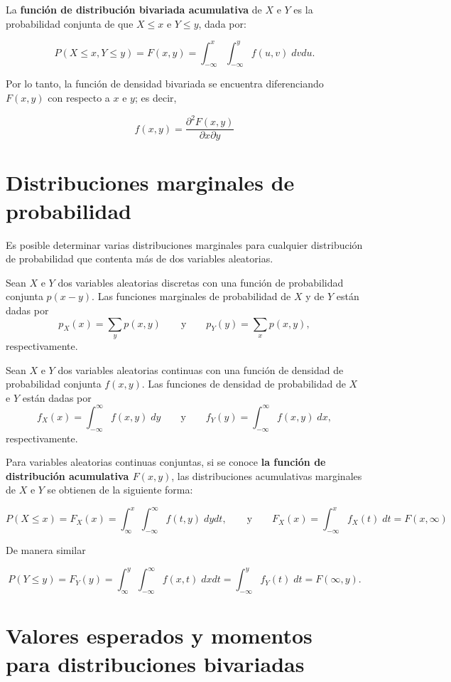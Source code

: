 La \textbf{función de distribución bivariada acumulativa} de $X$ e $Y$ es la probabilidad conjunta de que $X\leq x$ e $Y\leq y$, dada por:
\begin{tcolorbox}
    $$P(X\leq x, Y\leq y)=F(x,y)=\int_{-\infty}^x \int_{-\infty}^y f(u,v)\; dvdu.$$
\end{tcolorbox}
Por lo tanto, la función de densidad bivariada se encuentra diferenciando $F(x,y)$ con respecto a $x$ e $y$; es decir,

\begin{tcolorbox}
    $$f(x,y)=\dfrac{\partial^2 F(x,y)}{\partial x \partial y}$$
\end{tcolorbox}


\section{Distribuciones marginales de probabilidad}
Es posible determinar varias distribuciones marginales para cualquier distribución de probabilidad que contenta más de dos variables aleatorias.

\begin{tcolorbox}
    \begin{def.}
	Sean $X$ e $Y$ dos variables aleatorias discretas con una función de probabilidad conjunta $p(x-y)$. Las funciones marginales de probabilidad de $X$ y de $Y$ están dadas por
	$$p_X(x)=\sum_y p(x,y)\qquad \mbox{y}\qquad p_Y(y)=\sum_x p(x,y),$$
	respectivamente.
    \end{def.}
\end{tcolorbox}

\begin{tcolorbox}
    \begin{def.}
	Sean $X$ e $Y$ dos variables aleatorias continuas con una función de densidad de probabilidad conjunta $f(x,y)$. Las funciones de densidad de probabilidad de $X$ e $Y$ están dadas por
	$$f_X(x)=\int_{-\infty}^\infty f(x,y)\; dy \qquad \mbox{y} \qquad f_Y(y)=\int_{-\infty}^\infty f(x,y)\; dx,$$
	respectivamente.
    \end{def.}
\end{tcolorbox}

Para variables aleatorias continuas conjuntas, si se conoce \textbf{\boldmath la función de distribución acumulativa $F(x,y)$}, las distribuciones acumulativas marginales de $X$ e $Y$ se obtienen de la siguiente forma:

\begin{tcolorbox}
    $$P(X\leq x)=F_X(x)=\int_{\infty}^x \int_{-\infty}^\infty f(t,y)\; dydt,\qquad \mbox{y}\qquad F_X(x)=\int_{-\infty}^x f_X(t)\; dt = F(x,\infty)$$
\end{tcolorbox}

De manera similar

\begin{tcolorbox}
    $$P(Y\leq y)=F_Y(y)=\int_{\infty}^y \int_{-\infty}^\infty f(x,t)\; dxdt=\int_{-\infty}^y f_Y(t)\; dt = F(\infty,y).$$
\end{tcolorbox}


\section{Valores esperados y momentos para distribuciones bivariadas}

